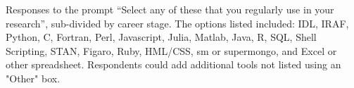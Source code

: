 \label{fig:stack1}

Responses to the prompt ``Select any of these that you regularly use in your research'', sub-divided by career stage.  The options listed included: IDL, IRAF, Python, C, Fortran, Perl, Javascript, Julia, Matlab, Java, R, SQL, Shell Scripting, STAN, Figaro, Ruby, HML/CSS, sm or supermongo, and Excel or other spreadsheet.  Respondents could add additional tools not listed using an "Other" box.